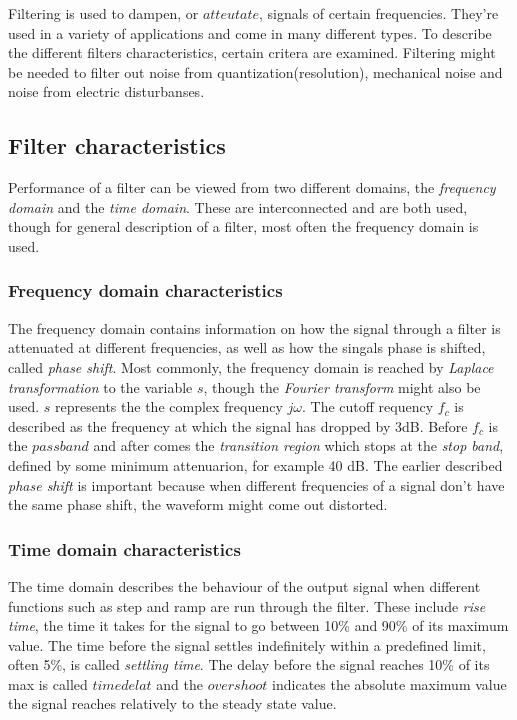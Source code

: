  Filtering is used to dampen, or $atteutate$, signals of certain frequencies.
They're used in a variety of applications and come in many different types. To
describe the different filters characteristics, certain critera are examined.
Filtering might be needed to filter out noise from quantization(resolution),
mechanical noise and noise from electric disturbanses.
\subsection*{Filter characteristics}
Performance of a filter can be viewed from two different domains, the \textit{frequency
domain} and the \textit{time domain}. These are interconnected and are both used,
though for general description of a filter, most often the frequency domain is
used.
\subsubsection*{Frequency domain characteristics}
The frequency domain contains information on how the signal through a filter is
attenuated at different frequencies, as well as how the singals phase is
shifted, called \textit{phase shift}. Most commonly, the frequency domain is reached by
\textit{Laplace transformation} to the variable $s$, though the \textit{Fourier
transform}
might also be used. $s$ represents the the complex frequency $j\omega$. The
cutoff requency $f_c$ is described as the frequency at which the signal has
dropped by 3dB. Before $f_c$ is the $passband$ and after comes the \textit{transition
region} which stops at the \textit{stop band}, defined by some minimum attenuarion, for
example 40 dB. The earlier described \textit{phase shift} is important because when
different frequencies of a signal don't have the same phase shift, the waveform
might come out distorted.
\subsubsection*{Time domain characteristics}
The time domain describes the behaviour of the output signal when different
functions such as step and ramp are run through the filter. These include
\textit{rise
time}, the time it takes for the signal to go between 10\% and 90\% of its
maximum value. The time before the signal settles indefinitely within a
predefined limit, often 5\%, is called \textit{settling time}. The delay before the
signal reaches 10\% of its max is called $time delat$ and the $overshoot$
indicates the absolute maximum value the signal reaches relatively to the steady
state value.
